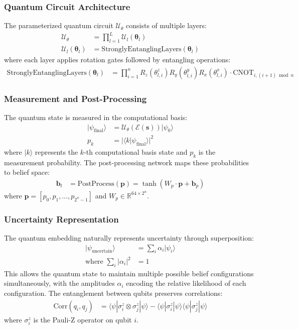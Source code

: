\documentclass[11pt]{article}
\begin{document}
\subsubsection{Quantum Circuit Architecture}
The parameterized quantum circuit $\mathcal{U}_{\theta}$ consists of multiple layers:
\begin{align}
    \mathcal{U}_{\theta} &= \prod_{l=1}^{L} \mathcal{U}_l(\boldsymbol{\theta}_l) \\
    \mathcal{U}_l(\boldsymbol{\theta}_l) &= \text{StronglyEntanglingLayers}(\boldsymbol{\theta}_l)
\end{align}
where each layer applies rotation gates followed by entangling operations:
\begin{align}
    \text{StronglyEntanglingLayers}(\boldsymbol{\theta}_l) &= \prod_{i=1}^{n} R_z(\theta_{l,i}^z) R_y(\theta_{l,i}^y) R_x(\theta_{l,i}^x) \cdot \text{CNOT}_{i,(i+1)\bmod n}
\end{align}

\subsubsection{Measurement and Post-Processing}
The quantum state is measured in the computational basis:
\begin{align}
    |\psi_{\text{final}}\rangle &= \mathcal{U}_{\theta}(\mathcal{E}(\mathbf{s}))|\psi_0\rangle \\
    p_k &= |\langle k | \psi_{\text{final}} \rangle|^2
\end{align}
where $|k\rangle$ represents the $k$-th computational basis state and $p_k$ is the measurement probability. The post-processing network maps these probabilities to belief space:
\begin{align}
    \mathbf{b}_t &= \text{PostProcess}(\mathbf{p}) = \tanh(W_p \cdot \mathbf{p} + \mathbf{b}_p)
\end{align}
where $\mathbf{p} = [p_0, p_1, \ldots, p_{2^n-1}]$ and $W_p \in \mathbb{R}^{64 \times 2^n}$.

\subsubsection{Uncertainty Representation}
The quantum embedding naturally represents uncertainty through superposition:
\begin{align}
    |\psi_{\text{uncertain}}\rangle &= \sum_{i} \alpha_i |\psi_i\rangle \\
    \text{where } \sum_{i} |\alpha_i|^2 &= 1
\end{align}
This allows the quantum state to maintain multiple possible belief configurations simultaneously, with the amplitudes $\alpha_i$ encoding the relative likelihood of each configuration. The entanglement between qubits preserves correlations:
\begin{align}
    \text{Corr}(q_i, q_j) &= \langle \psi | \sigma_i^z \otimes \sigma_j^z | \psi \rangle - \langle \psi | \sigma_i^z | \psi \rangle \langle \psi | \sigma_j^z | \psi \rangle
\end{align}
where $\sigma_i^z$ is the Pauli-Z operator on qubit $i$.
\end{document}
